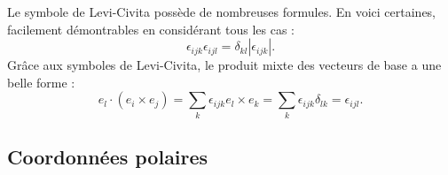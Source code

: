 Le symbole de Levi-Civita possède de nombreuses formules. En voici certaines, facilement démontrables en considérant tous les cas :
\begin{equation}
	\epsilon_{ijk}\epsilon_{ijl}=\delta_{kl}| \epsilon_{ijk} |.
\end{equation}
Grâce aux symboles de Levi-Civita, le produit mixte des vecteurs de base a une belle forme :
\begin{equation}        \label{EqProdMixteepsilonCicivr}
	e_l\cdot(e_i\times e_j)=\sum_k\epsilon_{ijk}e_l\times e_k=\sum_k\epsilon_{ijk}\delta_{lk}=\epsilon_{ijl}.
\end{equation}

\subsection{Coordonnées polaires}

